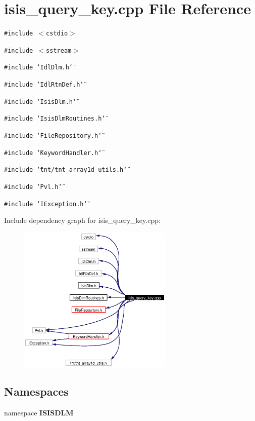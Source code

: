 \section{isis\_\-query\_\-key.cpp File Reference}
\label{isis__query__key_8cpp}
{\tt \#include $<$cstdio$>$}\par
{\tt \#include $<$sstream$>$}\par
{\tt \#include \char`\"{}Idl\-Dlm.h\char`\"{}}\par
{\tt \#include \char`\"{}Idl\-Rtn\-Def.h\char`\"{}}\par
{\tt \#include \char`\"{}Isis\-Dlm.h\char`\"{}}\par
{\tt \#include \char`\"{}Isis\-Dlm\-Routines.h\char`\"{}}\par
{\tt \#include \char`\"{}File\-Repository.h\char`\"{}}\par
{\tt \#include \char`\"{}Keyword\-Handler.h\char`\"{}}\par
{\tt \#include \char`\"{}tnt/tnt\_\-array1d\_\-utils.h\char`\"{}}\par
{\tt \#include \char`\"{}Pvl.h\char`\"{}}\par
{\tt \#include \char`\"{}i\-Exception.h\char`\"{}}\par


Include dependency graph for isis\_\-query\_\-key.cpp:\begin{figure}[H]
\begin{center}
\leavevmode
\includegraphics[width=209pt]{isis__query__key_8cpp__incl}
\end{center}
\end{figure}
\subsection*{Namespaces}
\begin{CompactItemize}
\item 
namespace {\bf ISISDLM}
\end{CompactItemize}
